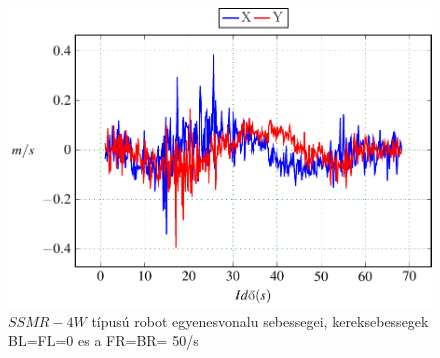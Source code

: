 \begin{figure}[H]
  \includegraphics{tikz/Left0Right50e.pdf}
  \caption{$SSMR-4W$ típusú robot egyenesvonalu sebessegei, kereksebessegek BL=FL=0 es a FR=BR= 50\degree/s}
  \label{fig:Left0Right50e}  
\end{figure}










